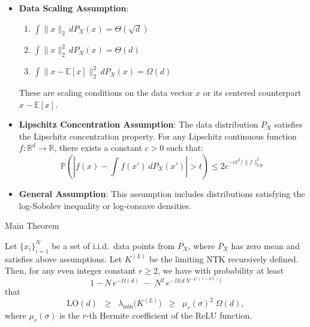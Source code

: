 \documentclass[serif, aspectratio=169]{beamer}
\begin{document}
\begin{frame}
	\begin{itemize}
		\item \textbf{Data Scaling Assumption}:
		\begin{enumerate}
			\item \( \int \|x\|_2 \, dP_X(x) = \Theta(\sqrt{d}) \)
			\item \( \int \|x\|_2^2 \, dP_X(x) = \Theta(d) \)
			\item \( \int \|x - \mathbb{E}[x]\|_2^2 \, dP_X(x) = \Omega(d) \)
		\end{enumerate}
		These are scaling conditions on the data vector \( x \) or its centered counterpart \( x - \mathbb{E}[x] \).
		
		\item \textbf{Lipschitz Concentration Assumption}:
		The data distribution \( P_X \) satisfies the Lipschitz concentration property. For any Lipschitz continuous function \( f : \mathbb{R}^d \to \mathbb{R} \), there exists a constant \( c > 0 \) such that:
		\[
		\mathbb{P}\left( \left| f(x) - \int f(x')\, dP_X(x') \right| > t \right) \leq 2 e^{-c t^2 / \|f\|_{\mathrm{Lip}}^2}
		\]
		
		\item \textbf{General Assumption}: This assumption includes distributions satisfying the log-Sobolev inequality or log-concave densities.
	\end{itemize}
\end{frame}



\begin{frame}{Main Theorem}
	\begin{theorem}
		\label{thm:smallest-eig-NTK}
		Let $\{x_i\}_{i=1}^N$ be a set of i.i.d.\ data points from $P_X$, where $P_X$ has 
		zero mean and satisfies above assumptions. Let $K^{(L)}$ be the limiting 
		NTK recursively defined. Then, for any even integer constant $r \ge 2$, 
		we have with probability at least 
		\[
		1 - N\,e^{-\Omega(d)} \;-\; N^2\,e^{-\Omega\bigl(d\,N^{-2/(\,r - 0.5\,)}\bigr)}
		\]
		that
		\[
		\mathrm{LO}(d) 
		\;\;\ge\;\;
		\lambda_{\min}\bigl(K^{(L)}\bigr) 
		\;\;\ge\;\;
		\mu_{r}(\sigma)^{2}\;\Omega(d),
		\]
		where $\mu_{r}(\sigma)$ is the $r$-th Hermite coefficient of the ReLU function.
	\end{theorem}
	
\end{frame}
\end{document}
